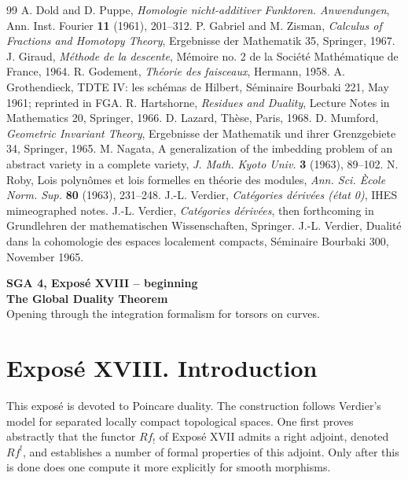 \documentclass[12pt]{article}
\begin{document}
\begin{thebibliography}{99}
 A. Dold and D. Puppe, \emph{Homologie nicht-additiver Funktoren. Anwendungen}, Ann. Inst. Fourier \textbf{11} (1961), 201--312.
 P. Gabriel and M. Zisman, \emph{Calculus of Fractions and Homotopy Theory}, Ergebnisse der Mathematik 35, Springer, 1967.
 J. Giraud, \emph{M\'ethode de la descente}, M\'emoire no. 2 de la Soci\'et\'e Math\'ematique de France, 1964.
 R. Godement, \emph{Th\'eorie des faisceaux}, Hermann, 1958.
 A. Grothendieck, TDTE IV: les sch\'emas de Hilbert, S\'eminaire Bourbaki 221, May 1961; reprinted in FGA.
 R. Hartshorne, \emph{Residues and Duality}, Lecture Notes in Mathematics 20, Springer, 1966.
 D. Lazard, Th\`ese, Paris, 1968.
 D. Mumford, \emph{Geometric Invariant Theory}, Ergebnisse der Mathematik und ihrer Grenzgebiete 34, Springer, 1965.
 M. Nagata, A generalization of the imbedding problem of an abstract variety in a complete variety, \emph{J. Math. Kyoto Univ.} \textbf{3} (1963), 89--102.
 N. Roby, Lois polyn\^omes et lois formelles en th\'eorie des modules, \emph{Ann. Sci. \`Ecole Norm. Sup.} \textbf{80} (1963), 231--248.
 J.-L. Verdier, \emph{Cat\'egories d\'eriv\'ees (\'etat 0)}, IHES mimeographed notes.
 J.-L. Verdier, \emph{Cat\'egories d\'eriv\'ees}, then forthcoming in Grundlehren der mathematischen Wissenschaften, Springer.
 J.-L. Verdier, Dualit\'e dans la cohomologie des espaces localement compacts, S\'eminaire Bourbaki 300, November 1965.
\end{thebibliography}

\clearpage
\begin{center}
{\Large \textbf{SGA 4, Expos\'e XVIII -- beginning}}\\[0.35em]
{\large \textbf{The Global Duality Theorem}}\\[0.25em]
{\normalsize Opening through the integration formalism for torsors on curves.}
\end{center}

\section*{Expos\'e XVIII. Introduction}

This expos\'e is devoted to Poincare duality. The construction follows Verdier's model for separated locally compact topological spaces. One first proves abstractly that the functor \(Rf_!\) of Expos\'e XVII admits a right adjoint, denoted \(Rf^!\), and establishes a number of formal properties of this adjoint. Only after this is done does one compute it more explicitly for smooth morphisms.
\end{document}

